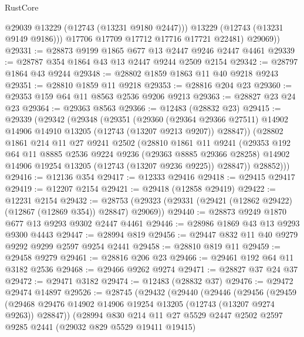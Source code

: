 \begin{lexlean}{RustCore}
\begin{coremodule}
              @29039
              @13229
              (@12743 (@13231 @9180 @2447)))
            @13229
            (@12743 (@13231 @9149 @9186)))
          @17706
          @17709
          @17712
          @17716
          @17721
          @22481)
        @29069))
@29331 := @28873 @9199 @1865 @677 @13 @2447 @9246 @2447 @4461
@29339 := @28787 @354 @1864 @43 @13 @2447 @9244 @2509 @2154
@29342 := @28797 @1864 @43 @9244
@29348 := @28802 @1859 @1863 @11 @40 @9218 @9243
@29351 := @28810 @1859 @11 @9218
@29353 := @28816 @204 @23
@29360 := @29353 @159 @64 @11 @8563 @2536 @9206 @9213
@29363 := @28827 @23 @24 @23
@29364 := @29363 @8563
@29366 := @12483 (@28832 @23)
@29415 := @29339
    (@29342
      (@29348
        (@29351
          (@29360
            (@29364 @29366 @27511)
            @14902
            @14906
            @14910
            @13205
            (@12743 (@13207 @9213 @9207))
            @28847))
        (@28802
          @1861
          @214
          @11
          @27
          @9241
          @2502
          (@28810
            @1861
            @11
            @9241
            (@29353
              @192
              @64
              @11
              @8885
              @2536
              @9224
              @9236
              (@29363 @8885 @29366 @28258)
              @14902
              @14906
              @19254
              @13205
              (@12743 (@13207 @9236 @9225))
              @28847))
          @28852)))
@29416 := @12136 @354
@29417 := @12333 @29416
@29418 := @29415 @29417
@29419 := @12207 @2154
@29421 := @29418 (@12858 @29419)
@29422 := @12231 @2154
@29432 := @28753 (@29323 (@29331 (@29421 (@12862 @29422) (@12867 (@12869 @354)) @28847) @29069))
@29440 := @28873 @9249 @1870 @677 @13 @9293 @9302 @2447 @4461
@29446 := @28986 @1869 @43 @13 @9293 @9300 @4443
@29447 := @28994 @819
@29456 := @29447 @832 @11 @40 @9279 @9292 @9299 @2597 @9254 @2441
@29458 := @28810 @819 @11
@29459 := @29458 @9279
@29461 := @28816 @206 @23
@29466 := @29461 @192 @64 @11 @3182 @2536
@29468 := @29466 @9262 @9274
@29471 := @28827 @37 @24 @37
@29472 := @29471 @3182
@29474 := @12483 (@28832 @37)
@29476 := @29472 @29474 @14897
@29526 := @28745
    (@29432
      (@29440
        (@29446
          (@29456
            (@29459
              (@29468 @29476 @14902 @14906 @19254 @13205 (@12743 (@13207 @9274 @9263)) @28847))
            (@28994
              @830
              @214
              @11
              @27
              @5529
              @2447
              @2502
              @2597
              @9285
              @2441
              (@29032 @829 @5529 @19411 @19415)

\end{coremodule}
\end{lexlean}
